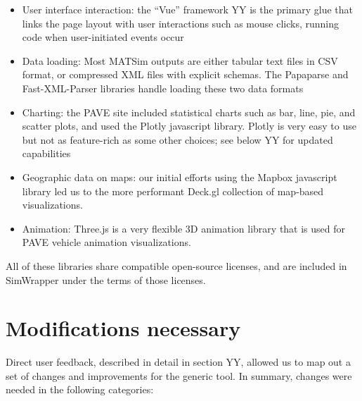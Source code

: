 \begin{itemize}
\item
  User interface interaction: the ``Vue'' framework YY is the primary
  glue that links the page layout with user interactions such as mouse
  clicks, running code when user-initiated events occur
\item
  Data loading: Most MATSim outputs are either tabular text files in CSV
  format, or compressed XML files with explicit schemas. The Papaparse
  and Fast-XML-Parser libraries handle loading these two data formats
\item
  Charting: the PAVE site included statistical charts such as bar, line,
  pie, and scatter plots, and used the Plotly javascript library. Plotly
  is very easy to use but not as feature-rich as some other choices; see
  below YY for updated capabilities
\item
  Geographic data on maps: our initial efforts using the Mapbox
  javascript library led us to the more performant Deck.gl collection of
  map-based visualizations.
\item
  Animation: Three.js is a very flexible 3D animation library that is
  used for PAVE vehicle animation visualizations.
\end{itemize}

All of these libraries share compatible open-source licenses, and are
included in SimWrapper under the terms of those licenses.


\hypertarget{modifications-necessary}{%
\section{Modifications necessary}\label{modifications-necessary}}

Direct user feedback, described in detail in section YY, allowed us to
map out a set of changes and improvements for the generic tool. In
summary, changes were needed in the following categories:

